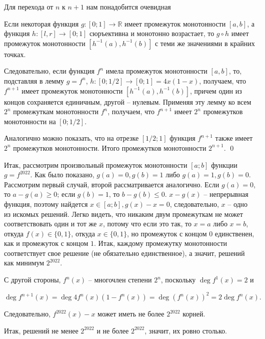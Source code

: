Для перехода от $n$ к $n + 1$ нам понадобится очевидная

\begin{lemma}
    Если некоторая функция $g: [0; 1] \to \mathbb{R}$ имеет промежуток монотонности $[a, b]$, а функция $h: [l, r] \to [0; 1]$ сюръективна и монотонно возрастает, то $g \circ h$ имеет промежуток монотонности $[h^{-1}(a), h^{-1}(b)]$ с теми же значениями в крайних точках.
\end{lemma}

Следовательно, если функция $f^n$ имела промежуток монотонности $[a, b]$, то, подставляя в лемму $g = f^n$, $h: [0; 1/2] \to [0; 1] = 4x(1-x)$, получаем, что $f^{n+1}$ имеет промежуток монотонности $[h^{-1}(a), h^{-1}(b)]$, причем один из концов сохраняется единичным, другой -- нулевым. Применяя эту лемму ко всем $2^n$ промежуткам монотонности $f^n$, получаем, что $f^{n+1}$ имеет $2^n$ промежутков монотонности на $[0; 1/2]$.

Аналогично можно показать, что на отрезке $[1/2; 1]$ функция $f^{n+1}$ также имеет $2^n$ промежутков монотонности. Итого промежутков монотонности $2^{n+1}$. \qed

Итак, рассмотрим произвольный промежуток монотонности $[a; b]$ функции $g = f^{2022}$. Как было показано, $g(a) = 0, g(b) = 1$ либо $g(a) = 1, g(b) = 0$. Рассмотрим первый случай, второй рассматривается аналогично. Если $g(a) = 0$, то $a - g(a) \ge 0$; если $g(b) = 1$, то $b - g(b) \le 0$. $x - g(x)$ -- непрерывная функция, поэтому найдется $x \in [a; b], g(x) - x = 0$, следовательно, $x$ -- одно из искомых решений. Легко видеть, что никаким двум промежуткам не может соответствовать один и тот же $x$, потому что если это так, то $x = a$ либо $x = b$, откуда $f(x) \in \{0, 1\}$, откуда $x \in \{0, 1\}$, но промежуток с концом $0$ единственен, как и промежуток с концом $1$. Итак, каждому промежутку монотонности соответствует свое решение (не обязательно единственное), а значит, решений как минимум $2^{2022}$.

С другой стороны, $f^n(x)$ -- многочлен степени $2^n$, поскольку $\deg f^1(x) = 2$ и

\begin{equation*}
    \deg f^{n+1}(x) = \deg 4 f^n(x) (1 - f^n(x)) = \deg (f^n(x))^2 = 2 \deg f^n(x).
\end{equation*}

Следовательно, $f^{2022}(x) - x$ может иметь не более $2^{2022}$ корней.

Итак, решений не менее $2^{2022}$ и не более $2^{2022}$, значит, их ровно столько.


